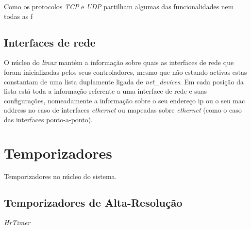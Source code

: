 Como os protocolos \textit{TCP} e \textit{UDP} partilham algumas das
funcionalidades nem todas as f

\subsection{Interfaces de rede}

O núcleo do \textit{linux} mantém a informação sobre quais as interfaces de
rede que foram inicializadas pelos seus controladores, mesmo que não estando
activas estas constantam de uma lista duplamente ligada de
\textit{net\_devices}. Em cada posição da lista está toda a informação
referente a uma interface de rede e suas configurações, nomeadamente a
informação sobre o seu endereço ip ou o seu mac address no caso de interfaces
\textit{ethernet} ou mapeadas sobre \textit{ethernet} (como o caso das
interfaces ponto-a-ponto).


\section{Temporizadores}

Temporizadores no núcleo do sistema.


\subsection{Temporizadores de Alta-Resolução}

\textit{HrTimer}

